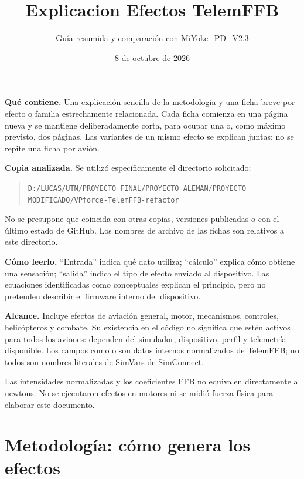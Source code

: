 \documentclass[11pt,a4paper]{article}
\title{Explicacion Efectos TelemFFB}
\author{Guía resumida y comparación con MiYoke\_PD\_V2.3}
\date{8 de octubre de 2026}
\newcommand{\code}[1]{\texttt{\detokenize{#1}}}
\begin{document}
\maketitle
\textbf{Qué contiene.} Una explicación sencilla de la metodología y una ficha breve por efecto o familia estrechamente relacionada. Cada ficha comienza en una página nueva y se mantiene deliberadamente corta, para ocupar una o, como máximo previsto, dos páginas. Las variantes de un mismo efecto se explican juntas; no se repite una ficha por avión.

\textbf{Copia analizada.} Se utilizó específicamente el directorio solicitado:
\begin{quote}\small
\nolinkurl{D:/LUCAS/UTN/PROYECTO FINAL/PROYECTO ALEMAN/PROYECTO MODIFICADO/VPforce-TelemFFB-refactor}
\end{quote}
No se presupone que coincida con otras copias, versiones publicadas o con el último estado de GitHub. Los nombres de archivo de las fichas son relativos a este directorio.

\textbf{Cómo leerlo.} ``Entrada'' indica qué dato utiliza; ``cálculo'' explica cómo obtiene una sensación; ``salida'' indica el tipo de efecto enviado al dispositivo. Las ecuaciones identificadas como conceptuales explican el principio, pero no pretenden describir el firmware interno del dispositivo.

\textbf{Alcance.} Incluye efectos de aviación general, motor, mecanismos, controles, helicópteros y combate. Su existencia en el código no significa que estén activos para todos los aviones: dependen del simulador, dispositivo, perfil y telemetría disponible. Los campos como \code{TAS} o \code{WeightOnWheels} son datos internos normalizados de TelemFFB; no todos son nombres literales de SimVars de SimConnect.

Las intensidades normalizadas y los coeficientes FFB no equivalen directamente a newtons. No se ejecutaron efectos en motores ni se midió fuerza física para elaborar este documento.
\tableofcontents

\clearpage
\section{Metodología: cómo genera los efectos}
\end{document}
